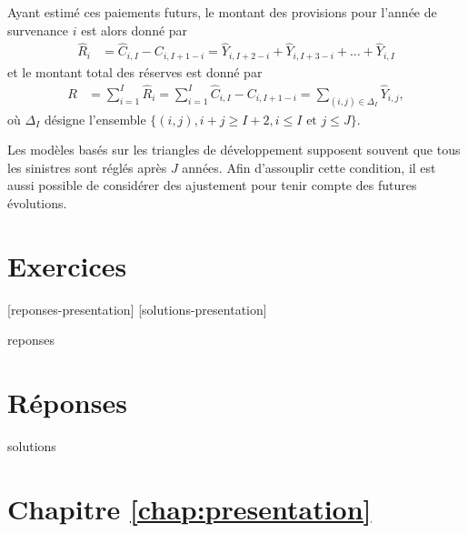 Ayant estimé ces paiements futurs, le montant des provisions pour
l'année de survenance $i$ est alors donné par
\begin{align*}
  \hat{R}_i &= \hat{C}_{i,I} - C_{i, I+1-i} =
                  \hat{Y}_{i,I+2-i} + \hat{Y}_{i,I+3-i} + \dots +
                  \hat{Y}_{i,I}
\end{align*}
et le montant total des réserves est donné par
\begin{align*}
R &= \sum_{i=1}^I \hat{R}_i = \sum_{i=1}^I \hat{C}_{i,I} -
C_{i, I+1-i} = \sum_{(i,j) \in \Delta_I } \hat{Y}_{i,j},
\end{align*}
où $\Delta_I$ désigne l'ensemble
$\{(i, j), i + j \ge I + 2, i \le I \text{ et } j \le J \}$.

Les modèles basés sur les triangles de développement supposent souvent
que tous les sinistres sont réglés après $J$ années. Afin d'assouplir
cette condition, il est aussi possible de considérer des ajustement
pour tenir compte des futures évolutions.


\section{Exercices}
\label{sec:presentation:exercices}

[reponses-presentation]
[solutions-presentation]

\begin{Filesave}{reponses}
\bigskip
\section*{Réponses}

\end{Filesave}

\begin{Filesave}{solutions}
\section*{Chapitre \ref*{chap:presentation}}

\end{Filesave}

